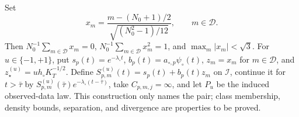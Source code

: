 Set
\[
 x_m=\frac{m-(N_0+1)/2}{\sqrt{(N_0^2-1)/12}},\qquad m\in\mathcal D.
\]
Then \(N_0^{-1}\sum_{m\in\mathcal D}x_m=0\), \(N_0^{-1}\sum_{m\in\mathcal D}x_m^2=1\), and \(\max_m|x_m|<\sqrt3\).  For \(u\in\{-1,+1\}\), put \(s_p(t)=e^{-\lambda_\circ t}\), \(b_p(t)=a_{\circ,p}\psi_\circ(t)\), \(z_m=x_m\) for \(m\in\mathcal D\), and \(z_\star^{(u)}=u h_\circ K_T^{-1/2}\).  Define \(S_{p,m}^{(u)}(t)=s_p(t)+b_p(t)z_m\) on \(\mathcal I\), continue it for \(t>\bar\tau\) by \(S_{p,m}^{(u)}(\bar\tau)e^{-\lambda_\circ(t-\bar\tau)}\), take \(C_{p,m,j}=\infty\), and let \(P_u\) be the induced observed-data law.  This construction only names the pair; class membership, density bounds, separation, and divergence are properties to be proved.